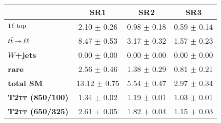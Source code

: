 \begin{tabular}{|l|ccc|}
\hline
&
\textbf{SR1}   &
\textbf{SR2}   &
\textbf{SR3}   \\
\hline
\textbf{$1\ell~\text{top}$}          & 2.10 $\pm$ 0.26   & 0.98 $\pm$ 0.18   & 0.59 $\pm$ 0.14 \\
\textbf{$t\bar{t} \rightarrow \ell \ell$}           & 8.47 $\pm$ 0.53   & 3.17 $\pm$ 0.32   & 1.57 $\pm$ 0.23 \\
\textbf{$W$+jets}                 & 0.00 $\pm$ 0.00   & 0.00 $\pm$ 0.00   & 0.00 $\pm$ 0.00 \\
\textbf{rare}                     & 2.56 $\pm$ 0.46   & 1.38 $\pm$ 0.29   & 0.81 $\pm$ 0.21 \\
\hline
\textbf{total SM}                 & 13.12 $\pm$ 0.75  & 5.54 $\pm$ 0.47   & 2.97 $\pm$ 0.34 \\
\hline
\textbf{\textsc{T2tt} (850/100)}  & 1.34 $\pm$ 0.02   & 1.19 $\pm$ 0.01   & 1.03 $\pm$ 0.01 \\
\textbf{\textsc{T2tt} (650/325)}  & 2.61 $\pm$ 0.05   & 1.82 $\pm$ 0.04   & 1.15 $\pm$ 0.03 \\
\hline
\end{tabular}



